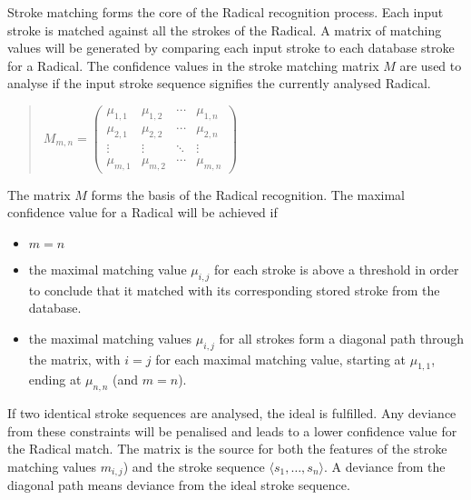 Stroke matching forms the core of the Radical recognition process.
Each input stroke is matched against all the strokes of the Radical. 
A matrix of matching values will be generated by comparing each input stroke 
to each database stroke for a Radical.
The confidence values in the stroke matching matrix \(M\) are used to analyse 
if the input stroke sequence signifies the currently analysed Radical.
\begin{quote}
\(
 M_{m,n} = 
 \begin{pmatrix}
  \mu_{1,1} & \mu_{1,2} & \cdots & \mu_{1,n} \\
  \mu_{2,1} & \mu_{2,2} & \cdots & \mu_{2,n} \\
  \vdots  & \vdots  & \ddots & \vdots  \\
  \mu_{m,1} & \mu_{m,2} & \cdots & \mu_{m,n} 
 \end{pmatrix}
\)
\end{quote}
The matrix \(M\) forms the basis of the Radical recognition. The maximal 
confidence value for a Radical will be achieved if
\begin{itemize}
  \item \( m = n \) 
  \item the maximal matching value \(\mu_{i,j}\) for each stroke is above a
        threshold in order to conclude that it matched with its corresponding 
        stored stroke from the database.
  \item the maximal matching values \(\mu_{i,j}\) for all strokes form a diagonal 
        path through the matrix, with \( i = j \) for each maximal matching 
        value, starting at \(\mu_{1,1}\), ending at 
        \(\mu_{n,n}\) (and \(m=n\)).
\end{itemize}
If two identical stroke sequences are analysed, the ideal is fulfilled.
Any deviance from these constraints will be penalised and leads to a lower
confidence value for the Radical match. The matrix is the source for both 
the features of the stroke matching values \(m_{i,j}\)) and the stroke sequence
\(\langle s_1,\ldots,s_n \rangle \). A deviance from the diagonal path means deviance from the 
ideal stroke sequence.



